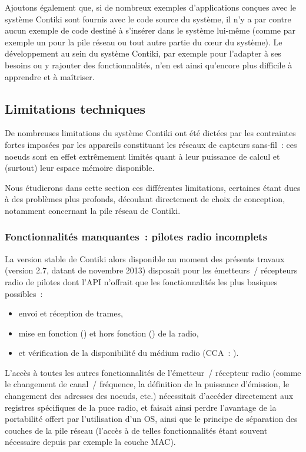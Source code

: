 Ajoutons également que, si de nombreux exemples d'applications conçues
avec le système Contiki sont fournis avec le code source du système,
il n'y a par contre aucun exemple de code destiné à s'insérer dans
le système lui-même (comme par exemple un  pour la pile
réseau ou tout autre partie du c{\oe}ur du système). Le développement
au sein du système Contiki, par exemple pour l'adapter à ses besoins
ou y rajouter des fonctionnalités, n'en est ainsi qu'encore plus
difficile à apprendre et à maîtriser.


\subsection{Limitations techniques}
\label{SubsecLimContiki}

De nombreuses limitations du système Contiki ont été dictées par les
contraintes fortes imposées par les appareils constituant les réseaux de
capteurs sans-fil~: ces noeuds sont en effet extrêmement limités quant à
leur puissance de calcul et (surtout) leur espace mémoire disponible.

Nous étudierons dans cette section ces différentes limitations, certaines
étant dues à des problèmes plus profonds, découlant directement de
choix de conception, notamment concernant la pile réseau de Contiki.

\subsubsection{Fonctionnalités manquantes~: pilotes radio incomplets}
\label{ParAPIRadioContiki}

La version stable de Contiki alors disponible au moment des présents
travaux (version 2.7, datant de novembre 2013) disposait pour les
émetteurs~/ récepteurs radio de pilotes dont l'API n'offrait que les
fonctionnalités les plus basiques possibles~:
\begin{itemize}
\item envoi et réception de trames,
\item mise en fonction () et hors fonction ()
de la radio,
\item et vérification de la disponibilité du médium radio (CCA~: ).
\end{itemize}
L'accès à toutes les autres fonctionnalités de l'émetteur~/ récepteur radio
(comme le changement de canal~/ fréquence, la définition de la puissance
d'émission, le changement des adresses des noeuds, etc.) nécessitait
d'accéder directement aux registres spécifiques de la puce radio, et faisait
ainsi perdre l'avantage de la portabilité offert par l'utilisation d'un OS,
ainsi que le principe de séparation des couches de la pile réseau (l'accès
à de telles fonctionnalités étant souvent nécessaire depuis par exemple
la couche MAC).

